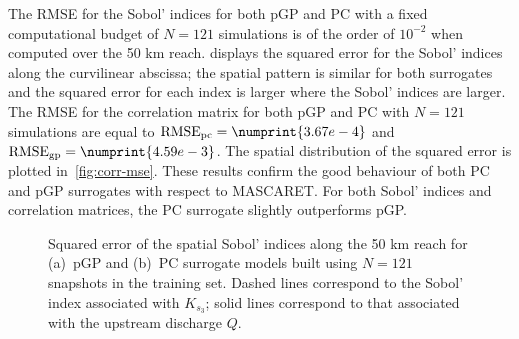 The RMSE for the Sobol' indices for both pGP and PC with a fixed computational budget of $N = 121$ simulations is of the order of $10^{-2}$ when computed over the 50 km reach.  displays the squared error for the Sobol' indices along the curvilinear abscissa; the spatial pattern is similar for both surrogates and the squared error for each index is larger where the Sobol' indices are larger. The RMSE for the correlation matrix for both pGP and PC with $N = 121$ simulations are equal to $\text{RMSE}_{\text{pc}} = \numprint{3.67e-4}$ and $\text{RMSE}_{\text{gp}} = \numprint{4.59e-3}$. The spatial distribution of the squared error is plotted in~\cref{fig:corr-mse}. These results confirm the good behaviour of both PC and pGP surrogates with respect to MASCARET. For both Sobol' indices and correlation matrices, the PC surrogate slightly outperforms pGP. 

\begin{figure}[!h]               
\centering
{}
\caption{Squared error of the spatial Sobol' indices along the 50 km reach for (a)~pGP and (b)~PC surrogate models built using $N = 121$ snapshots in the training set. Dashed lines correspond to the Sobol' index associated with $K_{s_3}$; solid lines correspond to that associated with the upstream discharge $Q$.}
\label{fig:sobol-map}
\end{figure}

